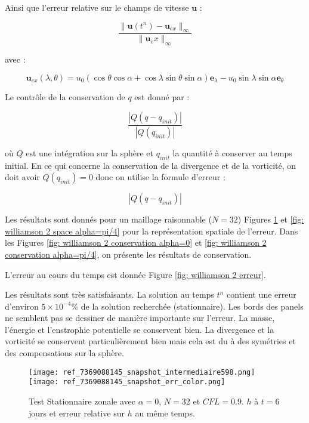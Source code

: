 Ainsi que l'erreur relative sur le champs de vitesse $\mathbf{u}$ : 

\begin{equation}
\dfrac{\| \mathbf{u}(t^n) - \mathbf{u}_{ex}\|_{\infty}}{\| \mathbf{u}_ex \|_\infty}
\end{equation}

avec :

\begin{equation}
\mathbf{u}_{ex}(\lambda, \theta) = u_0 \left( \cos \theta \cos \alpha + \cos \lambda \sin \theta \sin \alpha \right) \mathbf{e}_{\lambda} - u_0 \sin \lambda \sin \alpha \mathbf{e}_{\theta}
\end{equation}

Le contrôle de la conservation de $q$ est donné par :

\begin{equation}
\dfrac{|Q(q - q_{init})|}{|Q(q_{init})|}
\end{equation}

où $Q$ est une intégration sur la sphère et $q_{init}$ la quantité à conserver au temps initial. En ce qui concerne la conservation de la divergence et de la vorticité, on doit avoir $Q(q_{init})=0$ donc on utilise la formule d'erreur :

\begin{equation}
|Q(q - q_{init})|
\end{equation}

Les résultats sont donnés pour un maillage raisonnable ($N=32$)  Figures \ref{fig: williamson 2 space alpha=0} et \ref{fig: williamson 2 space alpha=pi/4} pour la représentation spatiale de l'erreur. Dans les Figures \ref{fig: williamson 2 conservation alpha=0} et \ref{fig: williamson 2 conservation alpha=pi/4}, on présente les résultats de conservation.

L'erreur au cours du temps est donnée Figure \ref{fig: williamson 2 erreur}.

Les résultats sont très satisfaisants. La solution au temps $t^n$ contient une erreur d'environ $5 \times 10^{-4} \%$ de la solution recherchée (stationnaire).
Les bords des panels ne semblent pas se dessiner de manière importante sur l'erreur. 
La masse, l'énergie et l'enstrophie potentielle se conservent bien. La divergence et la vorticité se conservent particulièrement bien mais cela est du à des symétries et des compensations sur la sphère.

\begin{figure}[htbp]
\begin{center}
\texttt{[image: ref\_7369088145\_snapshot\_intermediaire598.png]}\\
\texttt{[image: ref\_7369088145\_snapshot\_err\_color.png]}
\end{center}
\caption{Test Stationnaire zonale \cite{Williamson1992} avec $\alpha=0$, $N=32$ et $CFL=0.9$. $h$ à $t=6$ jours et erreur relative sur $h$ au même temps.}
\label{fig: williamson 2 space alpha=0}
\end{figure}

